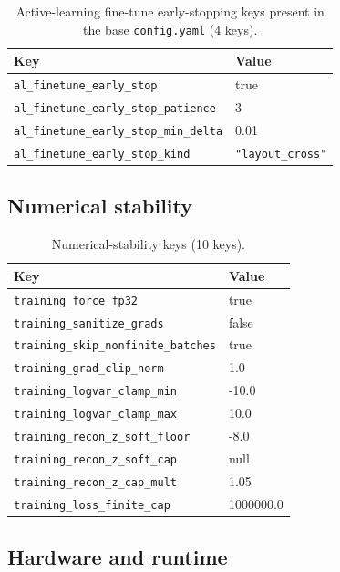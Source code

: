 \begin{table}[htbp]
\centering
\caption{Active-learning fine-tune early-stopping keys present in the base
\texttt{config.yaml} (4 keys).}
\label{tab:appb_earlystop}
\begin{tabular}{@{}ll@{}}
\hline
Key & Value \\
\hline
\texttt{al\_finetune\_early\_stop} & true \\
\texttt{al\_finetune\_early\_stop\_patience} & 3 \\
\texttt{al\_finetune\_early\_stop\_min\_delta} & 0.01 \\
\texttt{al\_finetune\_early\_stop\_kind} & \texttt{"layout\_cross"} \\
\hline
\end{tabular}
\end{table}

\subsection{Numerical stability}
\label{subsec:appb_numerics}

\begin{table}[htbp]
\centering
\caption{Numerical-stability keys (10 keys).}
\label{tab:appb_numerics}
\begin{tabular}{@{}ll@{}}
\hline
Key & Value \\
\hline
\texttt{training\_force\_fp32} & true \\
\texttt{training\_sanitize\_grads} & false \\
\texttt{training\_skip\_nonfinite\_batches} & true \\
\texttt{training\_grad\_clip\_norm} & 1.0 \\
\texttt{training\_logvar\_clamp\_min} & -10.0 \\
\texttt{training\_logvar\_clamp\_max} & 10.0 \\
\texttt{training\_recon\_z\_soft\_floor} & -8.0 \\
\texttt{training\_recon\_z\_soft\_cap} & null \\
\texttt{training\_recon\_z\_cap\_mult} & 1.05 \\
\texttt{training\_loss\_finite\_cap} & 1000000.0 \\
\hline
\end{tabular}
\end{table}

\subsection{Hardware and runtime}
\label{subsec:appb_runtime}

